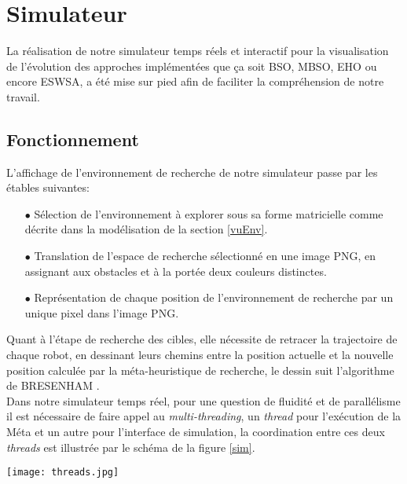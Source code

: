 

\section{Simulateur}
La réalisation de notre simulateur temps réels et interactif pour la visualisation de l'évolution des approches implémentées que ça soit BSO, MBSO, EHO ou encore ESWSA, a été mise sur pied afin de faciliter la compréhension de notre travail.

\subsection{Fonctionnement}
L'affichage de l'environnement de recherche de notre simulateur passe par les étables suivantes:
\begin{itemize}
	\item[$\bullet$] Sélection de l'environnement à explorer sous sa forme matricielle comme décrite dans la modélisation de la section \ref{vuEnv}.
	
	\item[$\bullet$] Translation de l'espace de recherche sélectionné en une image PNG, en assignant aux obstacles et à la portée deux couleurs distinctes.
	
	\item[$\bullet$] Représentation de chaque position de l'environnement de recherche par un unique pixel dans l'image PNG.\\
\end{itemize}

Quant à l'étape de recherche des cibles, elle nécessite de retracer la trajectoire de chaque robot, en dessinant leurs chemins entre la position actuelle et la nouvelle position calculée par la méta-heuristique de recherche, le dessin suit l'algorithme de BRESENHAM \cite{line}. \\

Dans notre simulateur temps réel, pour une question de fluidité et de parallélisme il est nécessaire de faire appel au \textit{multi-threading}, un \textit{thread} pour l'exécution de la Méta et un autre pour l'interface de simulation, la coordination entre ces deux \textit{threads} est illustrée par le schéma de la figure \ref{sim}.

\noindent
\begin{center}	  
	\captionsetup{width=0.8\linewidth}
	\texttt{[image: threads.jpg]}%
	\label{sim}%
\end{center}



